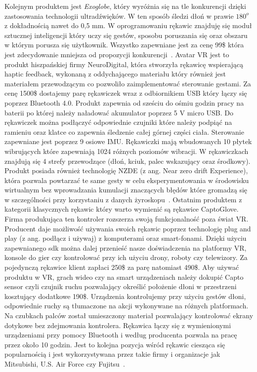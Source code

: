 Kolejnym produktem jest \textit{Exoglobe}, który wyróżnia się na tle konkurencji dzięki zastosowania technologii ultradźwięków. W ten sposób śledzi dłoń w prawie $180^o$ z dokładnością nawet do 0,5 mm. W oprogramowaniu rękawic znajduję się moduł sztucznej inteligencji który uczy się gestów, sposobu poruszania się oraz obszaru w którym porusza się użytkownik. Wszystko zapewniane jest za cenę 99\$ która jest zdecydowanie mniejsza od propozycji konkurencji~\cite{exo}. Avatar VR jest to produkt hiszpańskiej firmy NeuroDigital, która stworzyła rękawicę wspierającą haptic feedback, wykonaną z oddychającego materiału który również jest materiałem przewodzącym co pozwoliło zaimplementować sterowanie gestami. Za cenę 1500\$ dostajemy parę rękawiczek wraz z odbiornikiem USB który łączy się poprzez Bluetooth 4.0. Produkt zapewnia od sześciu do ośmiu godzin pracy na baterii po której należy naładować akumulator poprzez 5 V micro USB. Do rękawiczek można podłączyć odpowiednie czujniki które należy podpiąć na ramieniu oraz klatce co zapewnia śledzenie całej górnej części ciała. Sterowanie zapewniane jest poprzez 9 osiowe IMU. Rękawiczki mają wbudowanych 10 płytek wibrujących które zapewniają 1024 różnych poziomów wibracji. W rękawiczkach znajdują się 4 strefy przewodzące (dłoń, kciuk, palec wskazujący oraz środkowy). Produkt posiada również technologię NZDE (z ang. Near zero drift Experience), która pozwala powtarzać te same gesty w celu eksperymentowania w środowisku wirtualnym bez wprowadzania kumulacji znaczących błędów które gromadzą się w szczególności przy korzystaniu z danych żyroskopu~\cite{avatar}. Ostatnim produktem z kategorii klasycznych rękawic który warto wymienić są rękawice CaptoGlove. Firma produkująca ten kontroler rozszerza swoją funkcjonalność poza świat VR. Producent daje możliwość używania swoich rękawic poprzez technologię plug and play (z ang. podłącz i używaj) z komputerami oraz smart-fonami. Dzięki użyciu zapewnianego sdk można dalej przenieść nasze doświadczenia na platformy VR, konsole do gier czy kontrolować przy ich użyciu drony, roboty czy telewizory. Za pojedynczą rękawice klient zapłaci 250\$ za parę natomiast 490\$. Aby używać produktu w VR, grach wideo czy na smart urządzeniach należy dokupić Capto sensor czyli czujnik ruchu pozwalający określić położenie dłoni w przestrzeni kosztujący dodatkowe 190\$. Urządzenia kontrolujemy przy użyciu gestów dłoni, odpowiednie ruchy są tłumaczone na akcji wykonywane na różnych platformach. Na czubkach palców został umieszczony materiał pozwalający kontrolować ekrany dotykowe bez zdejmowania kontrolera. Rękawica łączy się z wymienionymi urządzeniami przy pomocy Bluetooth i według producenta pozwala na pracę przez około 10 godzin. Jest to kolejna pozycja wśród rękawic ciesząca się popularnością i jest wykorzystywana przez takie firmy i organizacje jak Mitsubishi, U.S. Air Force czy Fujitsu~\cite{capto}.  
	
